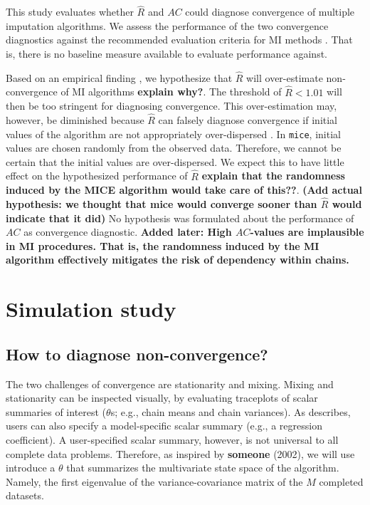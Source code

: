 \documentclass[Royal,times,sageh]{sagej}
\begin{document}
This study evaluates whether \(\widehat{R}\) and \(AC\) could diagnose
convergence of multiple imputation algorithms. We assess the performance
of the two convergence diagnostics against the recommended evaluation
criteria for MI methods \citep[i.e., average bias, average confidence
interval width, and empirical coverage rate across simulations;][\(\S\)
2.5.2]{buur18}. That is, there is no baseline measure available to
evaluate performance against.

Based on an empirical finding \citep{lace07}, we hypothesize that
\(\widehat{R}\) will over-estimate non-convergence of MI algorithms
\textbf{explain why?}. The threshold of \(\widehat{R} < 1.01\) will then
be too stringent for diagnosing convergence. This over-estimation may,
however, be diminished because \(\widehat{R}\) can falsely diagnose
convergence if initial values of the algorithm are not appropriately
over-dispersed \citep[p.~437]{broo98}. In \texttt{mice}, initial values
are chosen randomly from the observed data. Therefore, we cannot be
certain that the initial values are over-dispersed. We expect this to
have little effect on the hypothesized performance of \(\widehat{R}\)
\textbf{explain that the randomness induced by the MICE algorithm would
take care of this??}. \textbf{(Add actual hypothesis: we thought that
mice would converge sooner than \(\widehat{R}\) would indicate that it
did)} No hypothesis was formulated about the performance of \(AC\) as
convergence diagnostic. \textbf{Added later: High \(AC\)-values are
implausible in MI procedures. That is, the randomness induced by the MI
algorithm effectively mitigates the risk of dependency within chains.}

\hypertarget{simulation-study}{%
\section{Simulation study}\label{simulation-study}}

\hypertarget{how-to-diagnose-non-convergence}{%
\subsection{How to diagnose
non-convergence?}\label{how-to-diagnose-non-convergence}}

The two challenges of convergence are stationarity and mixing. Mixing
and stationarity can be inspected visually, by evaluating traceplots of
scalar summaries of interest (\(\theta\)s; e.g., chain means and chain
variances). As \citet{buur18} describes, users can also specify a
model-specific scalar summary (e.g., a regression coefficient). A
user-specified scalar summary, however, is not universal to all complete
data problems. Therefore, as inspired by \textbf{someone} (2002), we
will use introduce a \(\theta\) that summarizes the multivariate state
space of the algorithm. Namely, the first eigenvalue of the
variance-covariance matrix of the \(M\) completed datasets.
\end{document}
